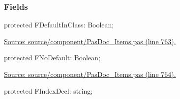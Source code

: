 \documentclass{report}
\newif\ifpdf
\begin{document}
\subsubsection*{\large{\textbf{Fields}}\normalsize\hspace{1ex}\hfill}
\begin{list}{}{
\setlength{\itemindent}{0cm}
\setlength{\listparindent}{0cm}
\setlength{\leftmargin}{\evensidemargin}
\addtolength{\leftmargin}{\tmplength}
\settowidth{\labelsep}{X}
\addtolength{\leftmargin}{\labelsep}
\setlength{\labelwidth}{\tmplength}
}
\label{PasDoc_Items.TPasProperty-FDefaultInClass}
\item[\textbf{FDefaultInClass}\hfill]
\ifpdf
\begin{flushleft}
\fi
\begin{ttfamily}
protected FDefaultInClass: Boolean;\end{ttfamily}

\ifpdf
\end{flushleft}
\fi


\par  \par
\href{https://github.com/pasdoc/pasdoc/blob/master/source/component/PasDoc_Items.pas#L763}{Source: source/component/PasDoc{\_}Items.pas (line 763).}\label{PasDoc_Items.TPasProperty-FNoDefault}
\item[\textbf{FNoDefault}\hfill]
\ifpdf
\begin{flushleft}
\fi
\begin{ttfamily}
protected FNoDefault: Boolean;\end{ttfamily}

\ifpdf
\end{flushleft}
\fi


\par  \par
\href{https://github.com/pasdoc/pasdoc/blob/master/source/component/PasDoc_Items.pas#L764}{Source: source/component/PasDoc{\_}Items.pas (line 764).}\label{PasDoc_Items.TPasProperty-FIndexDecl}
\item[\textbf{FIndexDecl}\hfill]
\ifpdf
\begin{flushleft}
\fi
\begin{ttfamily}
protected FIndexDecl: string;\end{ttfamily}

\ifpdf
\end{flushleft}
\fi



\end{list}
\end{document}
